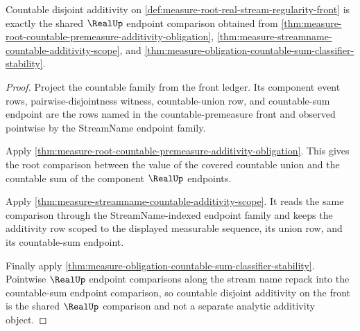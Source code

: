 \begin{theorem}
\label{thm:measure-root-real-stream-additivity-regularity}
Countable disjoint additivity on
\autoref{def:measure-root-real-stream-regularity-front} is exactly the shared
$\RealUp$ endpoint comparison obtained from
\autoref{thm:measure-root-countable-premeasure-additivity-obligation},
\autoref{thm:measure-streamname-countable-additivity-scope}, and
\autoref{thm:measure-obligation-countable-sum-classifier-stability}.
\end{theorem}
\begin{proof}
Project the countable family from the front ledger. Its component event rows,
pairwise-disjointness witness, countable-union row, and countable-sum endpoint
are the rows named in the countable-premeasure front and observed pointwise by
the StreamName endpoint family.

Apply
\autoref{thm:measure-root-countable-premeasure-additivity-obligation}. This
gives the root comparison between the value of the covered countable union and
the countable sum of the component $\RealUp$ endpoints.

Apply \autoref{thm:measure-streamname-countable-additivity-scope}. It reads
the same comparison through the StreamName-indexed endpoint family and keeps
the additivity row scoped to the displayed measurable sequence, its union row,
and its countable-sum endpoint.

Finally apply
\autoref{thm:measure-obligation-countable-sum-classifier-stability}. Pointwise
$\RealUp$ endpoint comparisons along the stream name repack into the
countable-sum endpoint comparison, so countable disjoint additivity on the
front is the shared $\RealUp$ comparison and not a separate analytic
additivity object.
\end{proof}

